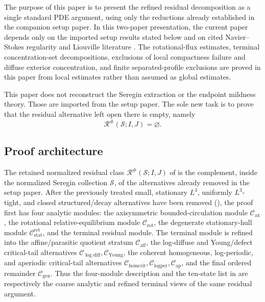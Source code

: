 \documentclass[11pt]{amsart}
\numberwithin{equation}{section}
\theoremstyle{plain}
\theoremstyle{definition}
\theoremstyle{remark}
\newcommand{\calS}{\mathcal S}
\newcommand{\calR}{\mathcal R}
\newcommand{\Cax}{\mathcal C_{\mathrm{ax}}}
\newcommand{\Crot}{\mathcal C_{\mathrm{rot}}}
\newcommand{\Cstat}{\mathcal C_{\mathrm{stat}}^{\mathrm{ret}}}
\newcommand{\Caff}{\mathcal C_{\mathrm{aff}}}
\newcommand{\Cgen}{\mathcal C_{\mathrm{gen}}}
\newcommand{\Chomcrit}{\mathcal C_{\mathrm{homcrit}}}
\newcommand{\Clogper}{\mathcal C_{\mathrm{logper}}}
\newcommand{\Capcrit}{\mathcal C_{\mathrm{ap}}}
\newcommand{\Cyoung}{\mathcal C_{\mathrm{Young}}}
\newcommand{\Clogdiff}{\mathcal C_{\log\mathrm{diff}}}
\begin{document}
The purpose of this paper is to present the refined residual decomposition as a
single standard PDE argument, using only the reductions already established in
the companion setup paper.  In this two-paper presentation, the current paper
depends only on the imported setup results stated below and on cited
Navier--Stokes regularity and Liouville literature
\cite{KNSS2009,Seregin2012}.  The
rotational-flux estimates, terminal concentration-set decompositions,
exclusions of local compactness failure and diffuse exterior concentration, and
finite separated-profile exclusions are proved in this paper from local
estimates rather than assumed as global estimates.

This paper does not reconstruct the Seregin extraction or the endpoint mildness
theory.  Those are imported from the setup paper.  The sole new task is to
prove that the residual alternative left open there is empty, namely
\[
   \calR^\#(\calS;I,J)=\varnothing .
\]

\subsection{Proof architecture}
\label{subsec:proof-architecture}
The retained normalized residual class \(\calR^\#(\calS;I,J)\) of
 is the complement, inside the normalized Seregin
collection \(\calS\), of the alternatives already removed in the setup paper.
After the previously treated small, stationary \(L^3\), uniformly
\(L^3\)-tight, and closed structured/decay alternatives have been removed
(), the proof first has four analytic modules:
the axisymmetric bounded-circulation module \(\Cax\), the rotational
relative-equilibrium module \(\Crot\), the degenerate stationary-hull module
\(\Cstat\), and the terminal residual module.  The terminal module is refined
into the affine/parasitic quotient stratum \(\Caff\), the log-diffuse and
Young/defect critical-tail alternatives \(\Clogdiff,\Cyoung\), the coherent
homogeneous, log-periodic, and aperiodic critical-tail alternatives
\(\Chomcrit,\Clogper,\Capcrit\), and the final ordered remainder \(\Cgen\).
Thus the four-module description and the ten-state list in
 are respectively the coarse analytic and
refined terminal views of the same residual argument.
\end{document}
